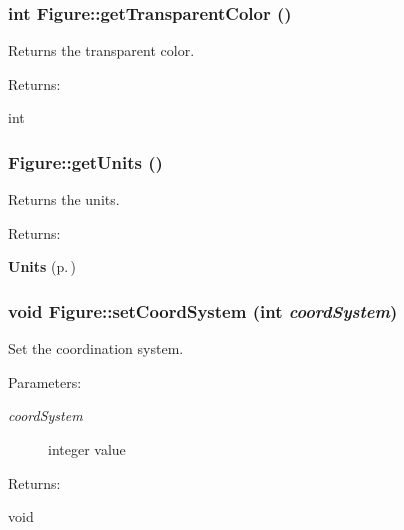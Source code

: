 \subsubsection{\setlength{\rightskip}{0pt plus 5cm}int Figure::get\-Transparent\-Color ()\hspace{0.3cm}{\tt  [inline]}}\label{classFigure_a17}


Returns the transparent color. \begin{Desc}
\item[Returns: ]\par
int \end{Desc}
\subsubsection{ Figure::get\-Units ()\hspace{0.3cm}{\tt  [inline]}}\label{classFigure_a13}


Returns the units. \begin{Desc}
\item[Returns: ]\par
{\bf Units} {\rm (p.\,\pageref{classFigure_s25})} \end{Desc}
\subsubsection{\setlength{\rightskip}{0pt plus 5cm}void Figure::set\-Coord\-System (int {\em coord\-System})\hspace{0.3cm}{\tt  [inline]}}\label{classFigure_a10}


Set the coordination system. \begin{Desc}
\item[Parameters: ]\par
\begin{description}
\item[{\em 
coord\-System}]integer value \end{description}
\end{Desc}
\begin{Desc}
\item[Returns: ]\par
void \end{Desc}
